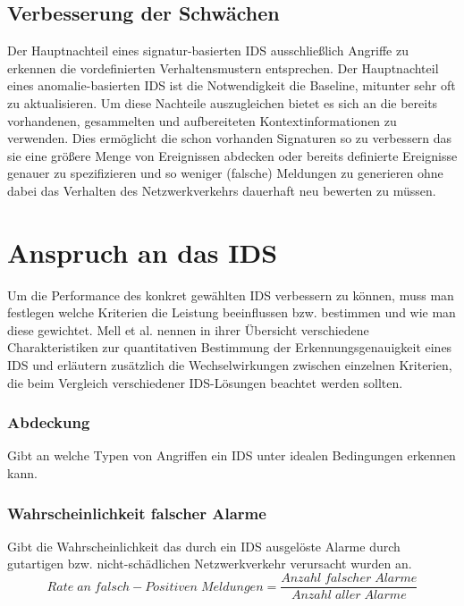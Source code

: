 \subsection{Verbesserung der Schwächen}
Der Hauptnachteil eines signatur-basierten IDS ausschließlich Angriffe zu erkennen die vordefinierten Verhaltensmustern entsprechen. Der Hauptnachteil eines anomalie-basierten IDS  ist die Notwendigkeit die Baseline, mitunter sehr oft zu aktualisieren. 
Um diese Nachteile auszugleichen bietet es sich an die bereits vorhandenen, gesammelten und aufbereiteten Kontextinformationen zu verwenden. Dies ermöglicht die schon vorhanden Signaturen so zu verbessern das sie eine größere Menge von Ereignissen abdecken oder bereits definierte Ereignisse genauer zu spezifizieren und so weniger (falsche) Meldungen zu generieren ohne dabei das Verhalten des Netzwerkverkehrs dauerhaft neu bewerten zu müssen.
\pagebreak
\section{Anspruch an das IDS}
Um die Performance des konkret gewählten IDS verbessern zu können, muss man festlegen welche Kriterien die Leistung beeinflussen bzw. bestimmen und wie man diese gewichtet.
Mell et al.\cite{mell2003overview} nennen in ihrer Übersicht verschiedene Charakteristiken zur quantitativen Bestimmung der Erkennungsgenauigkeit eines IDS und erläutern zusätzlich die Wechselwirkungen zwischen einzelnen Kriterien, die beim Vergleich verschiedener IDS-Lösungen beachtet werden sollten.
\subsubsection{Abdeckung}
Gibt an welche Typen von Angriffen ein IDS unter idealen Bedingungen erkennen kann.
\subsubsection{Wahrscheinlichkeit falscher Alarme}
Gibt die Wahrscheinlichkeit das durch ein IDS ausgelöste Alarme durch gutartigen bzw. nicht-schädlichen Netzwerkverkehr verursacht wurden an.\\
\[Rate\;an\;falsch-Positiven\;Meldungen = \frac{Anzahl\;falscher\;Alarme}{Anzahl\;aller\;Alarme}\]
